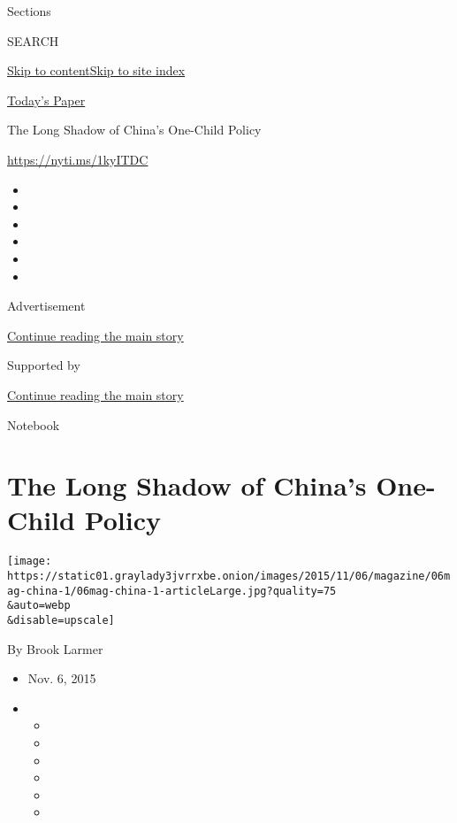 Sections

SEARCH

\protect\hyperlink{site-content}{Skip to
content}\protect\hyperlink{site-index}{Skip to site index}

\href{https://myaccount.nytimes3xbfgragh.onion/auth/login?response_type=cookie\&client_id=vi}{}

\href{https://www.nytimes3xbfgragh.onion/section/todayspaper}{Today's
Paper}

The Long Shadow of China's One-Child Policy

\url{https://nyti.ms/1kyITDC}

\begin{itemize}
\item
\item
\item
\item
\item
\item
\end{itemize}

Advertisement

\protect\hyperlink{after-top}{Continue reading the main story}

Supported by

\protect\hyperlink{after-sponsor}{Continue reading the main story}

Notebook

\hypertarget{the-long-shadow-of-chinas-one-child-policy}{%
\section{The Long Shadow of China's One-Child
Policy}\label{the-long-shadow-of-chinas-one-child-policy}}

\texttt{[image: https://static01.graylady3jvrrxbe.onion/images/2015/11/06/magazine/06mag-china-1/06mag-china-1-articleLarge.jpg?quality=75\\\&auto=webp\\\&disable=upscale]}

By Brook Larmer

\begin{itemize}
\item
  Nov. 6, 2015
\item
  \begin{itemize}
  \item
  \item
  \item
  \item
  \item
  \item
  \end{itemize}
\end{itemize}

